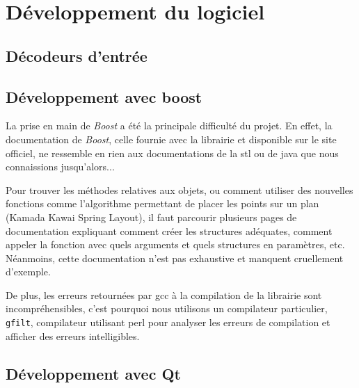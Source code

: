 \section{Développement du logiciel}
\subsection{Décodeurs d'entrée}
\subsection{Développement avec boost}
La prise en main de \textit{Boost} a été la principale difficulté du projet. En effet, la documentation de \textit{Boost}, celle fournie avec la librairie et disponible sur le site officiel, ne ressemble en rien aux documentations de la stl ou de java que nous connaissions jusqu'alors...

Pour trouver les méthodes relatives aux objets, ou comment utiliser des nouvelles fonctions comme l'algorithme permettant de placer les points sur un plan (Kamada Kawai Spring Layout), il faut parcourir plusieurs pages de documentation expliquant comment créer les structures adéquates, comment appeler la fonction avec quels arguments et quels structures en paramètres, etc. Néanmoins, cette documentation n'est pas exhaustive et manquent cruellement d'exemple. 

De plus, les erreurs retournées par gcc à la compilation de la librairie sont incompréhensibles, c'est pourquoi nous utilisons un compilateur particulier, \verb|gfilt|, compilateur utilisant perl pour analyser les erreurs de compilation et afficher des erreurs intelligibles. 

\subsection{D\'eveloppement avec Qt}



